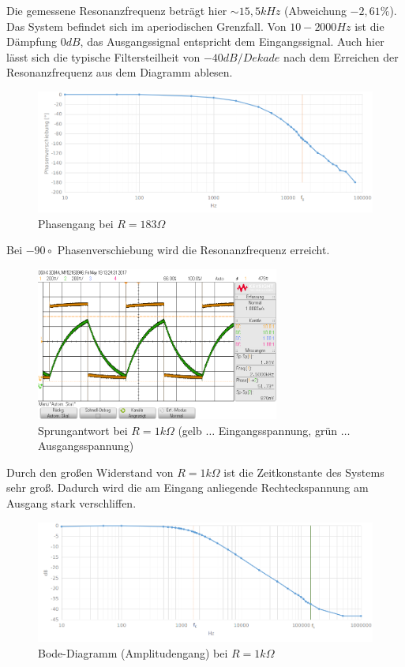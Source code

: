 \documentclass[12pt,a4paper,titlepage]{article}
\begin{document}
\noindent Die gemessene Resonanzfrequenz betr\"agt hier $\sim15,5kHz$ (Abweichung $-2,61\%$). Das System befindet sich im aperiodischen Grenzfall. Von $10-2000Hz$ ist die Dämpfung $0dB$, das Ausgangssignal entspricht dem Eingangssignal. Auch hier lässt sich die typische Filtersteilheit von $-40dB/Dekade$ nach dem Erreichen der Resonanzfrequenz aus dem Diagramm ablesen.

\begin{figure}[H]
  \centering
  \includegraphics[width=150mm]{phasengang_rlc_180.png}
  \caption{Phasengang bei $R=183\Omega$}
\end{figure}

\noindent Bei $-90{\circ}$ Phasenverschiebung wird die Resonanzfrequenz erreicht.

\begin{figure}[H]
  \centering
  \includegraphics[width=80mm]{sprungantwort_rlc_1k.png}
  \caption{Sprungantwort bei $R=1k\Omega$ (gelb $\hdots$ Eingangsspannung, gr\"un $\hdots$ Ausgangsspannung)}
\end{figure}
\noindent Durch den großen Widerstand von $R=1k\Omega$ ist die Zeitkonstante des Systems sehr groß. Dadurch wird die am Eingang anliegende Rechteckspannung am Ausgang stark verschliffen.

\begin{figure}[H]
  \centering
  \includegraphics[width=150mm]{bode_rlc_1k.png}
  \caption{Bode-Diagramm (Amplitudengang) bei $R=1k\Omega$}
\end{figure}
\end{document}
